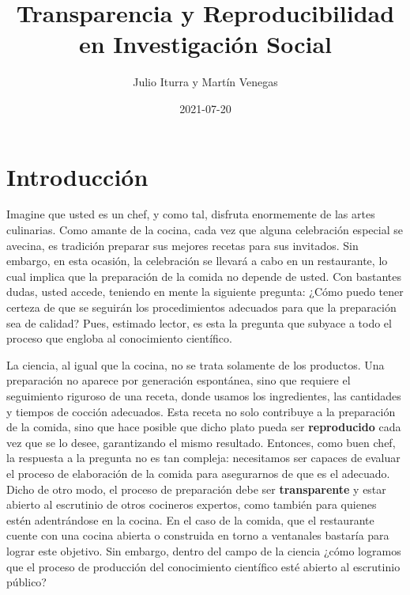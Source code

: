 \documentclass[
]{book}
\title{Transparencia y Reproducibilidad en Investigación Social}
\author{Julio Iturra y Martín Venegas}
\date{2021-07-20}
\begin{document}
\maketitle

{
\setcounter{tocdepth}{1}
\tableofcontents
}
\hypertarget{intro}{%
\chapter{Introducción}\label{intro}}

Imagine que usted es un chef, y como tal, disfruta enormemente de las artes culinarias. Como amante de la cocina, cada vez que alguna celebración especial se avecina, es tradición preparar sus mejores recetas para sus invitados. Sin embargo, en esta ocasión, la celebración se llevará a cabo en un restaurante, lo cual implica que la preparación de la comida no depende de usted. Con bastantes dudas, usted accede, teniendo en mente la siguiente pregunta: ¿Cómo puedo tener certeza de que se seguirán los procedimientos adecuados para que la preparación sea de calidad? Pues, estimado lector, es esta la pregunta que subyace a todo el proceso que engloba al conocimiento científico.

La ciencia, al igual que la cocina, no se trata solamente de los productos. Una preparación no aparece por generación espontánea, sino que requiere el seguimiento riguroso de una receta, donde usamos los ingredientes, las cantidades y tiempos de cocción adecuados. Esta receta no solo contribuye a la preparación de la comida, sino que hace posible que dicho plato pueda ser \textbf{reproducido} cada vez que se lo desee, garantizando el mismo resultado. Entonces, como buen chef, la respuesta a la pregunta no es tan compleja: necesitamos ser capaces de evaluar el proceso de elaboración de la comida para asegurarnos de que es el adecuado. Dicho de otro modo, el proceso de preparación debe ser \textbf{transparente} y estar abierto al escrutinio de otros cocineros expertos, como también para quienes estén adentrándose en la cocina. En el caso de la comida, que el restaurante cuente con una cocina abierta o construida en torno a ventanales bastaría para lograr este objetivo. Sin embargo, dentro del campo de la ciencia ¿cómo logramos que el proceso de producción del conocimiento científico esté abierto al escrutinio público?
\end{document}
